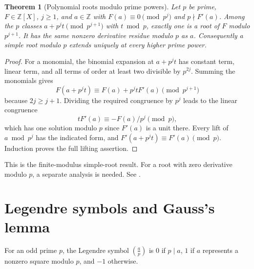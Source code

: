 \documentclass[11pt,oneside,openany]{book}
\theoremstyle{plain}
\newtheorem{theorem}{Theorem}[chapter]
\theoremstyle{definition}
\theoremstyle{remark}
\begin{document}
\begin{theorem}[Polynomial roots modulo prime powers]\label{nt:B05}
Let $p$ be prime, $F\in\mathbb Z[X]$, $j\ge1$, and
$a\in\mathbb Z$ with $F(a)\equiv0\pmod{p^j}$ and
$p\nmid F'(a)$. Among the $p$ classes
$a+p^j t\pmod{p^{j+1}}$ with $t\bmod p$, exactly one is a
root of $F$ modulo $p^{j+1}$. It has the same nonzero derivative
residue modulo $p$ as $a$. Consequently a simple root modulo $p$
extends uniquely at every higher prime power.
\end{theorem}
\begin{proof}
For a monomial, the binomial expansion at $a+p^jt$ has constant
term, linear term, and all terms of order at least two divisible
by $p^{2j}$. Summing the monomials gives
\[
 F(a+p^jt)\equiv F(a)+p^jtF'(a)\pmod{p^{j+1}}
\]
because $2j\ge j+1$. Dividing the required congruence by $p^j$
leads to the linear congruence
\[
 tF'(a)\equiv-F(a)/p^j\pmod p,
\]
which has one solution modulo $p$ since $F'(a)$ is a unit
there. Every lift of $a\bmod p^j$ has the indicated form,
and $F'(a+p^jt)\equiv F'(a)\pmod p$. Induction proves the
full lifting assertion.
\end{proof}
This is the finite-modulus simple-root result. For a root with
zero derivative modulo $p$, a separate analysis is needed.
See \cite[Thms.~5.28 and 5.30]{apostol}.

\section{Legendre symbols and Gauss's lemma}

For an odd prime $p$, the Legendre symbol $\left(\frac ap\right)$
is $0$ if $p\mid a$, $1$ if $a$ represents a nonzero square
modulo $p$, and $-1$ otherwise.
\end{document}
